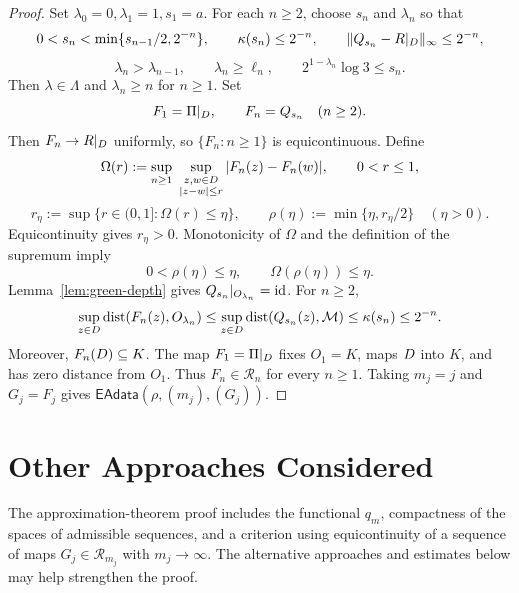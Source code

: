 \begin{proof}
Set \(\lambda_0=0,\lambda_1=1,s_1=a\). For each \(n\ge2\), choose
\(s_n\) and \(\lambda_n\) so that
\[
 0<s_n<\min\{s_{n-1}/2,2^{-n}\},\qquad
 \kappa(s_n)\le2^{-n},\qquad
 \|Q_{s_n}-R|_D\|_\infty\le2^{-n},
\]
\[
 \lambda_n>\lambda_{n-1},\qquad
 \lambda_n\ge\ell_n,\qquad
 2^{1-\lambda_n}\log3\le s_n.
\]
Then \(\lambda\in\Lambda\) and \(\lambda_n\ge n\) for \(n\ge1\).
Set
\[
 F_1=\Pi|_D,\qquad F_n=Q_{s_n}\quad(n\ge2).
\]
Then \(F_n\to R|_D\) uniformly, so \(\{F_n:n\ge1\}\) is
equicontinuous. Define
\[
 \Omega(r):=
 \sup_{n\ge1}\ \sup_{\substack{z,w\in D\\|z-w|\le r}}
 |F_n(z)-F_n(w)|,\qquad 0<r\le1,
\]
\[
 r_\eta:=\sup\{r\in(0,1]:\Omega(r)\le\eta\},\qquad
 \rho(\eta):=\min\{\eta,r_\eta/2\}\quad(\eta>0).
\]
Equicontinuity gives \(r_\eta>0\). Monotonicity of \(\Omega\) and the
definition of the supremum imply
\[
 0<\rho(\eta)\le\eta,\qquad \Omega(\rho(\eta))\le\eta.
\]
Lemma~\ref{lem:green-depth} gives \(Q_{s_n}|_{O_{\lambda_n}}=\operatorname{id}\).
For \(n\ge2\),
\[
 \sup_{z\in D}\operatorname{dist}(F_n(z),O_{\lambda_n})
 \le\sup_{z\in D}\operatorname{dist}(Q_{s_n}(z),\mathcal M)
 \le\kappa(s_n)\le2^{-n}.
\]
Moreover, \(F_n(D)\subseteq K\). The map \(F_1=\Pi|_D\) fixes
\(O_1=K\), maps \(D\) into \(K\), and has zero distance from \(O_1\).
Thus \(F_n\in\mathcal R_n\) for every \(n\ge1\). Taking \(m_j=j\) and
\(G_j=F_j\) gives \(\mathsf{EAdata}(\rho,(m_j),(G_j))\).
\end{proof}

\section{Other Approaches Considered}
\label{sec:other-approaches}

\noindent
The approximation-theorem proof includes the functional \(q_m\),
compactness of the spaces of admissible sequences, and a criterion
using equicontinuity of a sequence of maps \(G_j\in\mathcal R_{m_j}\)
with \(m_j\to\infty\). The alternative approaches and estimates below
may help strengthen the proof.


